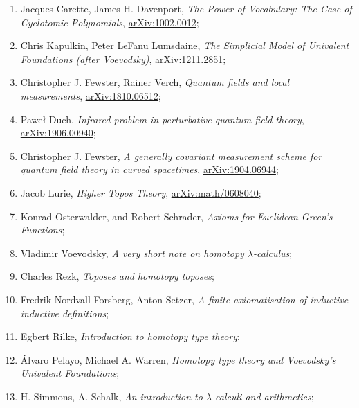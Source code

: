 \documentclass[a4paper,11pt]{article}
\begin{document}
\begin{enumerate}
\item Jacques Carette, James H. Davenport, \textit{The Power of
    Vocabulary: The Case of Cyclotomic Polynomials},
  \href{https://arxiv.org/abs/1002.0012v1}{arXiv:1002.0012};

\item Chris Kapulkin, Peter LeFanu Lumsdaine, \textit{The Simplicial
    Model of Univalent Foundations (after Voevodsky)},
  \href{https://arxiv.org/abs/1211.2851v5}{arXiv:1211.2851};

\item Christopher J. Fewster, Rainer Verch, \textit{Quantum fields and
    local measurements},
  \href{https://arxiv.org/abs/1810.06512}{arXiv:1810.06512};

\item Paweł Duch, \textit{Infrared problem in perturbative quantum
    field theory},
  \href{https://arxiv.org/abs/1906.00940}{arXiv:1906.00940};

\item Christopher J. Fewster, \textit{A generally covariant
    measurement scheme for quantum field theory in curved spacetimes},
  \href{https://arxiv.org/abs/1904.06944v1}{arXiv:1904.06944};

\item Jacob Lurie, \textit{Higher Topos Theory},
  \href{https://arxiv.org/abs/math/0608040v4}{arXiv:math/0608040};

\item Konrad Osterwalder, and Robert Schrader, \textit{Axioms for
    Euclidean Green's Functions};

\item Vladimir Voevodsky, \textit{A very short note on homotopy
    $\lambda$-calculus};

\item Charles Rezk, \textit{Toposes and homotopy toposes};

\item Fredrik Nordvall Forsberg, Anton Setzer, \textit{A finite
    axiomatisation of inductive-inductive definitions};

\item Egbert Rilke, \textit{Introduction to homotopy type theory};

\item \'{A}lvaro Pelayo, Michael A. Warren, \textit{Homotopy type
    theory and Voevodsky’s Univalent Foundations};

\item H. Simmons, A. Schalk, \textit{An introduction to
    $\lambda$-calculi and arithmetics};


\end{enumerate}
\end{document}
